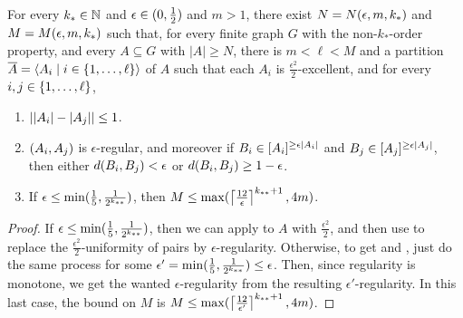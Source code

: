         \begin{theorem}[Theorem 5.19] \label{thm:existance_of_regular_partitions}
            For every $k_* \in \mathbb{N}$ and $\epsilon \in ( 0, \frac{1}{2} )$ and $m > 1$, there exist $N = N( \epsilon, m, k_* )$
            and $M = M( \epsilon, m, k_* )$ such that, for every finite graph $G$ with the non-$k_{*}$-order property,
            and every $A \subseteq G$ with $|A| \geq N$, there is $m < \ell < M$ and a partition
            $\overline{A} = \left< A_i \mid i \in \{ 1, \dots, \ell \} \right>$ of $A$ such that each $A_i$ is
            $\frac{\epsilon^2}{2}$-excellent, and for every $i, j \in \{ 1, \dots, \ell \}$,
            \begin{enumerate}
                \item \label{itm:existance_of_regular_partitions.1} $| | A_i |- | A_j | | \leq 1$.
                \item \label{itm:existance_of_regular_partitions.2} $( A_i, A_j )$ is $\epsilon$-regular, and moreover if
                    $B_i \in [ A_i ]^{\geq \epsilon | A_i |}$ and $B_j \in [ A_j ]^{\geq \epsilon | A_j |}$,
                    then either $d( B_i, B_j ) < \epsilon$ or $d( B_i, B_j ) \geq 1 - \epsilon$.
                \item \label{itm:existance_of_regular_partitions.3} If $\epsilon \leq \min ( \frac{1}{5}, \frac{1}{2^{k_{**}}} )$, then
                    $M \leq \max ( \left\lceil \frac{12}{\epsilon} \right\rceil^{k_{**}+1}, 4m )$.
            \end{enumerate}
            \begin{proof}
                If $\epsilon \leq \min ( \frac{1}{5}, \frac{1}{2^{k_{**}}} )$, then we can apply 
                to $A$ with $\frac{\epsilon^2}{2}$, and then use  to replace the
                $\frac{\epsilon^2}{2}$-uniformity of pairs by $\epsilon$-regularity.
                Otherwise, to get  and ,
                just do the same process for some $\epsilon' = \min ( \frac{1}{5}, \frac{1}{2^{k_{**}}} ) \leq \epsilon$.
                Then, since regularity is monotone, we get the wanted $\epsilon$-regularity from the resulting $\epsilon'$-regularity.
                In this last case, the bound on $M$ is $M \leq \max ( \left\lceil \frac{12}{\epsilon'} \right\rceil^{k_{**}+1}, 4m )$.
            \end{proof}
        \end{theorem}

